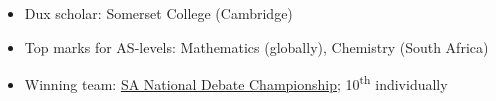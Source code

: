 \begin{itemize}
    \item Dux scholar: Somerset College (Cambridge)
    \item Top marks for AS-levels: Mathematics (globally), Chemistry (South Africa)
    \ifindustry %
        \item Winning team: \href{https://sadebating.org/phalaborwa-2016/}{SA National Debate \mbox{Championship}};
            10\textsuperscript{th} individually
    \fi %
\end{itemize}
